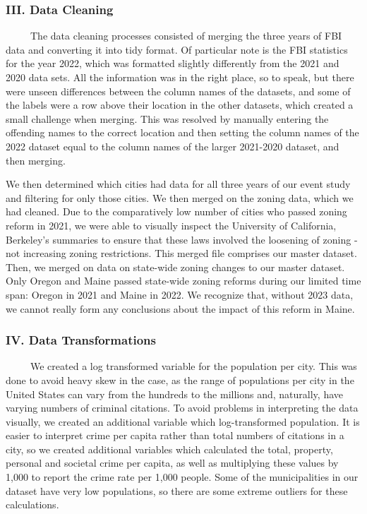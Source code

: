\documentclass[
  12pt,
]{article}
\begin{document}
\hypertarget{iii.-data-cleaning}{%
\subsubsection{III. Data Cleaning}\label{iii.-data-cleaning}}

\setlength\parindent{24pt}

~~~~~The data cleaning processes consisted of merging the three years of
FBI data and converting it into tidy format. Of particular note is the
FBI statistics for the year 2022, which was formatted slightly
differently from the 2021 and 2020 data sets. All the information was in
the right place, so to speak, but there were unseen differences between
the column names of the datasets, and some of the labels were a row
above their location in the other datasets, which created a small
challenge when merging. This was resolved by manually entering the
offending names to the correct location and then setting the column
names of the 2022 dataset equal to the column names of the larger
2021-2020 dataset, and then merging.

We then determined which cities had data for all three years of our
event study and filtering for only those cities. We then merged on the
zoning data, which we had cleaned. Due to the comparatively low number
of cities who passed zoning reform in 2021, we were able to visually
inspect the University of California, Berkeley's summaries to ensure
that these laws involved the loosening of zoning - not increasing zoning
restrictions. This merged file comprises our master dataset. Then, we
merged on data on state-wide zoning changes to our master dataset. Only
Oregon and Maine passed state-wide zoning reforms during our limited
time span: Oregon in 2021 and Maine in 2022. We recognize that, without
2023 data, we cannot really form any conclusions about the impact of
this reform in Maine.

\hypertarget{iv.-data-transformations}{%
\subsubsection{IV. Data
Transformations}\label{iv.-data-transformations}}

\setlength\parindent{24pt}

~~~~~We created a log transformed variable for the population per city.
This was done to avoid heavy skew in the case, as the range of
populations per city in the United States can vary from the hundreds to
the millions and, naturally, have varying numbers of criminal citations.
To avoid problems in interpreting the data visually, we created an
additional variable which log-transformed population. It is easier to
interpret crime per capita rather than total numbers of citations in a
city, so we created additional variables which calculated the total,
property, personal and societal crime per capita, as well as multiplying
these values by 1,000 to report the crime rate per 1,000 people. Some of
the municipalities in our dataset have very low populations, so there
are some extreme outliers for these calculations.
\end{document}
